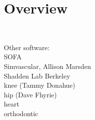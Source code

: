 \chapter{Overview}
%
~\cite{heartmech}~\cite{newheartpaper}~\cite{vorocrust1,vorocrust2,simpleware,persson}

Other software:\\
SOFA\\
Simvascular, Allison Marsden\\
Shadden Lab Berkeley\\
knee (Tammy Donahue) \\
hip (Dave Fhyrie) \\
heart \\
orthodontic \\